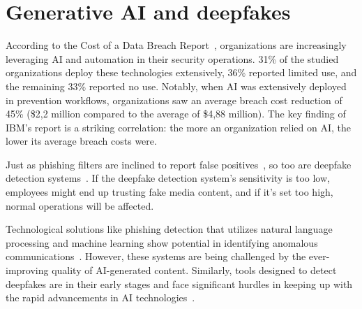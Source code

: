 \section{Generative AI and deepfakes}
\begin{comment}
\end{comment}

According to the Cost of a Data Breach Report~\citep{ibm_Cost_Data_Breach_Report_2024}, organizations are increasingly leveraging AI and automation in their security operations. 31\% of the studied organizations deploy these technologies extensively, 36\% reported limited use, and the remaining 33\% reported no use. Notably, when AI was extensively deployed in prevention workflows, organizations saw an average breach cost reduction of 45\% (\$2,2 million compared to the average of \$4,88 million). The key finding of IBM's report is a striking correlation: the more an organization relied on AI, the lower its average breach costs were.



Just as phishing filters are inclined to report false positives~\citep{fakhouri_AI_Driven_Solutions_SE_Attacks_2024}, so too are deepfake detection systems~\citep{mirsky_Creation_Detection_Deepfakes_2021}. If the deepfake detection system's sensitivity is too low, employees might end up trusting fake media content, and if it's set too high, normal operations will be affected.



Technological solutions like phishing detection that utilizes natural language processing and machine learning show potential in identifying anomalous communications~\citep{basit_Comprehensive_Survey_AI_Phishing_Detection_2021}. However, these systems are being challenged by the ever-improving quality of AI-generated content. Similarly, tools designed to detect deepfakes are in their early stages and face significant hurdles in keeping up with the rapid advancements in AI technologies~\citep{mirsky_Creation_Detection_Deepfakes_2021}.





